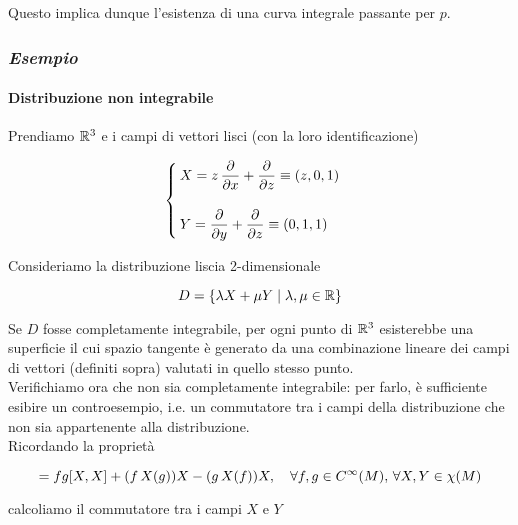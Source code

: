 Questo implica dunque l'esistenza di una curva integrale passante per $ p $.

\subsubsection{\textit{Esempio}}

\paragraph{Distribuzione non integrabile}

Prendiamo $ \mathbb{R}^{3} $ e i campi di vettori lisci (con la loro identificazione)

\begin{equation}
	\begin{cases}
		X = z \, \dpdv{x} + \dpdv{z} \equiv (z,0,1) \\ \\
		Y = \dpdv{y} + \dpdv{z} \equiv (0,1,1)
	\end{cases}
\end{equation}

Consideriamo la distribuzione liscia 2-dimensionale

\begin{equation}
	D = \{ \lambda X + \mu Y \mid \lambda,\mu \in \mathbb{R} \}
\end{equation}

Se $ D $ fosse completamente integrabile, per ogni punto di $ \mathbb{R}^{3} $ esisterebbe una superficie il cui spazio tangente è generato da una combinazione lineare dei campi di vettori (definiti sopra) valutati in quello stesso punto. \\
Verifichiamo ora che non sia completamente integrabile: per farlo, è sufficiente esibire un controesempio, i.e. un commutatore tra i campi della distribuzione che non sia appartenente alla distribuzione. \\
Ricordando la proprietà

\begin{equation}
	[fX,gX] = fg [X,X] + (f \, X(g)) X - (g \, X(f)) X \qcomma \forall f,g \in C^{\infty}(M), \,  \forall X,Y \in \chi(M)
\end{equation}

calcoliamo il commutatore tra i campi $ X $ e $ Y $

